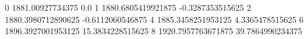 0 1881.00927734375 0.0
1 1880.6805419921875 -0.3287353515625
2 1880.3980712890625 -0.6112060546875
4 1885.3458251953125 4.3365478515625
6 1896.3927001953125 15.3834228515625
8 1920.7957763671875 39.7864990234375
